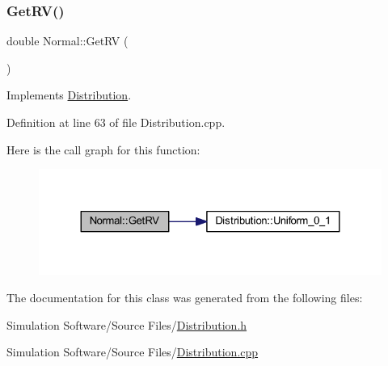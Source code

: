 \subsubsection{\texorpdfstring{Get\+R\+V()}{GetRV()}}
{\footnotesize\ttfamily double Normal\+::\+Get\+RV (\begin{DoxyParamCaption}{ }\end{DoxyParamCaption})\hspace{0.3cm}{\ttfamily [virtual]}}



Implements \hyperlink{class_distribution_a63b433850d7b47d84eb69448f7916719}{Distribution}.



Definition at line 63 of file Distribution.\+cpp.

Here is the call graph for this function\+:
\nopagebreak
\begin{figure}[H]
\begin{center}
\leavevmode
\includegraphics[width=324pt]{class_normal_a6101d2303601a4f7dfa33fe4b104df7e_cgraph}
\end{center}
\end{figure}


The documentation for this class was generated from the following files\+:\begin{DoxyCompactItemize}
\item 
Simulation Software/\+Source Files/\hyperlink{_distribution_8h}{Distribution.\+h}\item 
Simulation Software/\+Source Files/\hyperlink{_distribution_8cpp}{Distribution.\+cpp}\end{DoxyCompactItemize}
